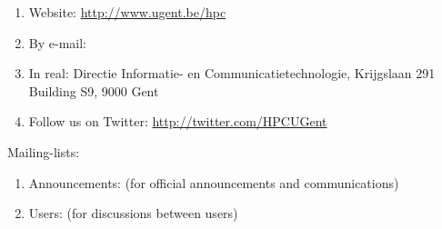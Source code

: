 \begin{enumerate}
\item  Website: \url{http://www.ugent.be/hpc}
\item  By e-mail:  \hpcinfo
\item  In real: Directie Informatie- en Communicatietechnologie, Krijgslaan 291 Building S9, 9000 Gent
\item  Follow us on Twitter: \url{http://twitter.com/HPCUGent}
\end{enumerate}

Mailing-lists:

\begin{enumerate}
\item  Announcements: \hpcannounceml (for official announcements and communications)
\item  Users: \hpcusersml (for discussions between users)
\end{enumerate}

